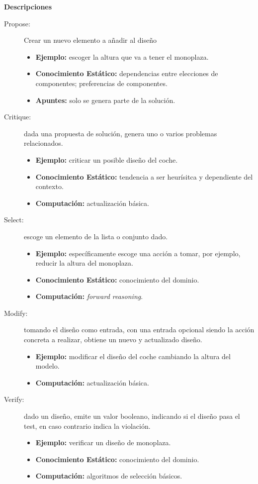 \documentclass[12pt,a4paper,twoside,spanish]{article}      %
\begin{document}
\textbf{Descripciones}
\begin{description}
    \item [Propose:] Crear un nuevo elemento a añadir al diseño
        \hspace*{2cm}
        \begin{itemize}
            \item \textbf {Ejemplo:} escoger la altura que va a tener el monoplaza.
            \item \textbf {Conocimiento Estático:} dependencias entre elecciones de componentes; preferencias de componentes.
            \item \textbf {Apuntes:} solo se genera parte de la solución.
        \end{itemize}
    \item [Critique:] dada una propuesta de solución, genera uno o varios problemas relacionados.
       \begin{itemize}
            \item \textbf {Ejemplo:} criticar un posible diseño del coche.
            \item \textbf {Conocimiento Estático:} tendencia a ser heurísitca y dependiente del contexto.
            \item \textbf {Computación:} actualización básica.
        \end{itemize}
    \item [Select:] escoge un elemento de la lista o conjunto dado.
        \begin{itemize}
            \item \textbf {Ejemplo:} específicamente escoge una acción a tomar, por ejemplo, reducir la altura del monoplaza.
            \item \textbf {Conocimiento Estático:} conocimiento del dominio.
            \item \textbf {Computación:} \emph{forward reasoning}.
        \end{itemize}
    \item [Modify:] tomando el diseño como entrada, con una entrada opcional siendo la acción concreta a realizar, obtiene un nuevo y actualizado diseño.
        \begin{itemize}
            \item \textbf {Ejemplo:} modificar el diseño del coche cambiando la altura del modelo.
            \item \textbf {Computación:} actualización básica.
        \end{itemize}
    \item [Verify:] dado un diseño, emite un valor booleano, indicando si el diseño pasa el test, en caso contrario indica la violación.
        \begin{itemize}
            \item \textbf {Ejemplo:} verificar un diseño de monoplaza.
            \item \textbf {Conocimiento Estático:} conocimiento del dominio.
            \item \textbf {Computación:} algoritmos de selección básicos.
        \end{itemize}
\end{description}
\end{document}
